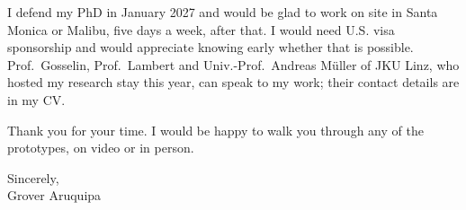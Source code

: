 \documentclass[11pt,letterpaper]{article}
\begin{document}
I defend my PhD in January 2027 and would be glad to work on site in Santa Monica or Malibu, five days a week, after that. I would need U.S. visa sponsorship and would appreciate knowing early whether that is possible. Prof.\ Gosselin, Prof.\ Lambert and Univ.-Prof.\ Andreas M\"uller of JKU Linz, who hosted my research stay this year, can speak to my work; their contact details are in my CV.

Thank you for your time. I would be happy to walk you through any of the prototypes, on video or in person.

Sincerely,\\
Grover Aruquipa
\end{document}
